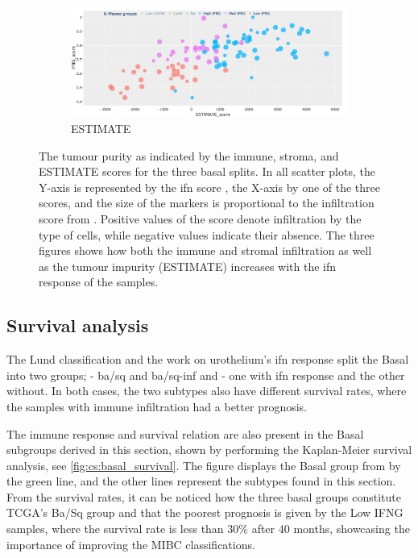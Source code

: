 \begin{figure}[H]
    \centering
    \begin{subfigure}[!t]{0.89\textwidth}
        \includegraphics[width=\textwidth,keepaspectratio]{Sections/ClusteringAnalysis/Resources/discussion/Estimate_spectrum.png}
        \caption{ESTIMATE}
        \label{fig:cs:estimate_basal}
    \end{subfigure}
    \centering
    \caption[New MIBC subgroups and their tumour purity]{The tumour purity as indicated by the immune, stroma, and ESTIMATE scores \citep{Yoshihara2013-wq} for the three basal splits. In all scatter plots, the Y-axis is represented by the \acrshort{ifn} score \citep{Baker2022-bj}, the X-axis by one of the three scores, and the size of the markers is proportional to the infiltration score from \citet{Robertson2017-mg}. Positive values of the score denote infiltration by the type of cells, while negative values indicate their absence. The three figures shows how both the immune and stromal infiltration as well as the tumour impurity (ESTIMATE) increases with the \acrshort{ifn} response of the samples.}
    \label{fig:cs:tumour_purity}
\end{figure}


\subsection{Survival analysis}

The Lund classification and the work on urothelium's \acrshort{ifn} response \citep{Baker2022-bj} split the Basal into two groups; \citep{Marzouka2018-ge} - \acrfull{ba/sq} and \acrfull{ba/sq-inf} and \citep{Baker2022-bj} - one with \acrshort{ifn} response and the other without. In both cases, the two subtypes also have different survival rates, where the samples with immune infiltration had a better prognosis.

The immune response and survival relation are also present in the Basal subgroups derived in this section, shown by performing the Kaplan-Meier survival analysis, see \cref{fig:cs:basal_survival}. The figure displays the Basal group from \citet{Robertson2017-mg} by the green line, and the other lines represent the subtypes found in this section. From the survival rates, it can be noticed how the three basal groups constitute TCGA's Ba/Sq group and that the poorest prognosis is given by the Low IFNG samples, where the survival rate is less than 30\% after 40 months, showcasing the importance of improving the MIBC classifications. 


